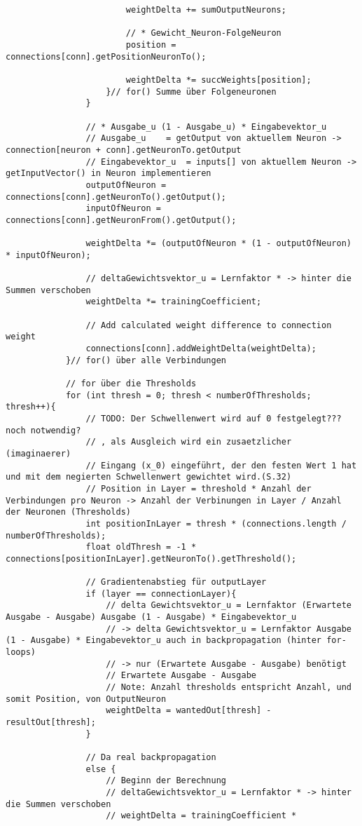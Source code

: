 \begin{lstlisting}
						weightDelta += sumOutputNeurons;
						
						// * Gewicht_Neuron-FolgeNeuron
						position = connections[conn].getPositionNeuronTo();
						
						weightDelta *= succWeights[position];
					}// for() Summe über Folgeneuronen
				}
				
				// * Ausgabe_u (1 - Ausgabe_u) * Eingabevektor_u
				// Ausgabe_u	= getOutput von aktuellem Neuron -> connection[neuron + conn].getNeuronTo.getOutput
				// Eingabevektor_u	= inputs[] von aktuellem Neuron -> getInputVector() in Neuron implementieren
				outputOfNeuron = connections[conn].getNeuronTo().getOutput();
				inputOfNeuron = connections[conn].getNeuronFrom().getOutput();
					
				weightDelta *= (outputOfNeuron * (1 - outputOfNeuron) * inputOfNeuron);
					
				// deltaGewichtsvektor_u = Lernfaktor * -> hinter die Summen verschoben
				weightDelta *= trainingCoefficient;
					
				// Add calculated weight difference to connection weight
				connections[conn].addWeightDelta(weightDelta);
			}// for() über alle Verbindungen
			
			// for über die Thresholds
			for (int thresh = 0; thresh < numberOfThresholds; thresh++){
				// TODO: Der Schwellenwert wird auf 0 festgelegt??? noch notwendig?
				// , als Ausgleich wird ein zusaetzlicher (imaginaerer)
				// Eingang (x_0) eingeführt, der den festen Wert 1 hat und mit dem negierten Schwellenwert gewichtet wird.(S.32)
				// Position in Layer = threshold * Anzahl der Verbindungen pro Neuron -> Anzahl der Verbinungen in Layer / Anzahl der Neuronen (Thresholds)
				int positionInLayer = thresh * (connections.length / numberOfThresholds);
				float oldThresh = -1 * connections[positionInLayer].getNeuronTo().getThreshold();
				
				// Gradientenabstieg für outputLayer
				if (layer == connectionLayer){
					// delta Gewichtsvektor_u = Lernfaktor (Erwartete Ausgabe - Ausgabe) Ausgabe (1 - Ausgabe) * Eingabevektor_u
					// -> delta Gewichtsvektor_u = Lernfaktor Ausgabe (1 - Ausgabe) * Eingabevektor_u auch in backpropagation (hinter for-loops)
					// -> nur (Erwartete Ausgabe - Ausgabe) benötigt
					// Erwartete Ausgabe - Ausgabe
					// Note: Anzahl thresholds entspricht Anzahl, und somit Position, von OutputNeuron
					weightDelta = wantedOut[thresh] - resultOut[thresh];
				}
				
				// Da real backpropagation
				else {
					// Beginn der Berechnung
					// deltaGewichtsvektor_u = Lernfaktor * -> hinter die Summen verschoben
					// weightDelta = trainingCoefficient * 
				  

\end{lstlisting}
